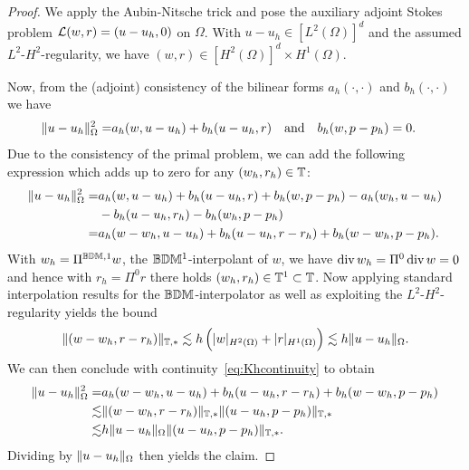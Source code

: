\documentclass[pdflatex,sn-mathphys,Numbered]{sn-jnl}%
\theoremstyle{remark}%
\theoremstyle{definition}%
\begin{document}
  \begin{proof}
    We apply the Aubin-Nitsche trick and pose the auxiliary adjoint Stokes problem $\mathcal{L}(w,r) =
    (u-u_h,0)$ on $\Omega$. With $u-u_h \in [L^2(\Omega)]^d$ and the assumed
    $L^2$-$H^2$-regularity, we have $(w,r) \in [H^2(\Omega)]^d \times H^1(\Omega)$.

    Now, from the (adjoint) consistency of the bilinear forms
    $a_h(\cdot,\cdot)$ and $b_h(\cdot,\cdot)$ we have
    \begin{align*}
      \Vert u-u_h \Vert_{\Omega}^2
      =&a_h(w,u-u_h) + b_h(u-u_h,r) \quad\text{and}\quad b_h(w,p-p_h) = 0.
    \end{align*}      
    Due to the consistency of the primal problem, we can add the following
    expression which adds up to zero for any $(w_h,r_h) \in \mathbb{T}$:
    \begin{align*}
      \nrm{u-u_h}_{\Omega}^2 =&a_h(w,u-u_h) + b_h(u-u_h,r) + b_h(w, p-p_h) 
       - a_h(w_h,u-u_h) \\ & -b_h(u-u_h,r_h) - b_h(w_h,p-p_h) 
        \\ %
         =&a_h(w-w_h,u-u_h) + b_h(u-u_h,r-r_h) + b_h(w-w_h, p-p_h). %
    \end{align*}
    With $w_h = \Pi^{\mathbb{B}\mathbb{D}\mathbb{M},1} w$, the $\mathbb{B}\mathbb{D}\mathbb{M}^1$-interpolant of $w$, we have
    $\operatorname{\mathrm{div}} w_h = \Pi^0 \operatorname{\mathrm{div}} w = 0$ and hence with $r_h = \Pi^0 r$ there holds
    $(w_h,r_h) \in \mathbb{T}^1 \subset \mathbb{T}$. 
    Now applying
    standard interpolation results for the $\mathbb{B}\mathbb{D}\mathbb{M}$-interpolator as well as exploiting the $L^2$-$H^2$-regularity yields the bound 
    $$ \Vert  (w-w_h,r-r_h)  \Vert_{\mathbb{T},\ast} \lesssim h \left( \vert w \vert_{H^2(\Omega)} +
      \vert r \vert_{H^1(\Omega)} \right) \lesssim h \Vert u-u_h \Vert_{\Omega}.$$
    We can then conclude with continuity~\eqref{eq:Khcontinuity} to obtain
    \begin{align*}
      \Vert u-u_h \Vert_{\Omega}^2
      =&a_h(w-w_h,u-u_h) + b_h(u-u_h,r-r_h) + b_h(w-w_h, p-p_h) \\
      \lesssim&  \Vert  (w-w_h,r-r_h)  \Vert_{\mathbb{T},\ast} \Vert  (u-u_h,p-p_h)  \Vert_{\mathbb{T},\ast}
      \\
      \lesssim&  h \Vert u-u_h \Vert_{\Omega} \Vert  (u-u_h,p-p_h)  \Vert_{\mathbb{T},\ast}.
    \end{align*}
    Dividing by $\Vert u-u_h \Vert_{\Omega}$ then yields the claim.
    \end{proof}
\end{document}
